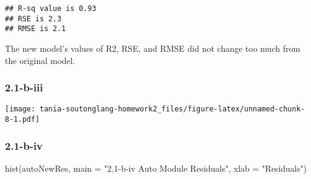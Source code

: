 \documentclass[
]{article}
\newenvironment{Shaded}{\begin{snugshade}}{\end{snugshade}}
\newcommand{\AttributeTok}[1]{\textcolor[rgb]{0.77,0.63,0.00}{#1}}
\newcommand{\DecValTok}[1]{\textcolor[rgb]{0.00,0.00,0.81}{#1}}
\newcommand{\FunctionTok}[1]{\textcolor[rgb]{0.00,0.00,0.00}{#1}}
\newcommand{\NormalTok}[1]{#1}
\newcommand{\OtherTok}[1]{\textcolor[rgb]{0.56,0.35,0.01}{#1}}
\newcommand{\SpecialCharTok}[1]{\textcolor[rgb]{0.00,0.00,0.00}{#1}}
\newcommand{\StringTok}[1]{\textcolor[rgb]{0.31,0.60,0.02}{#1}}
\begin{document}
\begin{Shaded}
\end{Shaded}

\begin{verbatim}
## R-sq value is 0.93
## RSE is 2.3
## RMSE is 2.1
\end{verbatim}

The new model's values of R2, RSE, and RMSE did not change too much from
the original model.

\hypertarget{b-iii}{%
\subsubsection{2.1-b-iii}\label{b-iii}}

\begin{Shaded}
\end{Shaded}

\texttt{[image: tania-soutonglang-homework2\_files/figure-latex/unnamed-chunk-8-1.pdf]}

\hypertarget{b-iv}{%
\subsubsection{2.1-b-iv}\label{b-iv}}

\begin{Shaded}
\begin{Highlighting}[]
\FunctionTok{hist}\NormalTok{(autoNewRes, }\AttributeTok{main =} \StringTok{"2.1{-}b{-}iv Auto Module Residuals"}\NormalTok{, }\AttributeTok{xlab =} \StringTok{"Residuals"}\NormalTok{)}
\end{Highlighting}
\end{Shaded}
\end{document}
